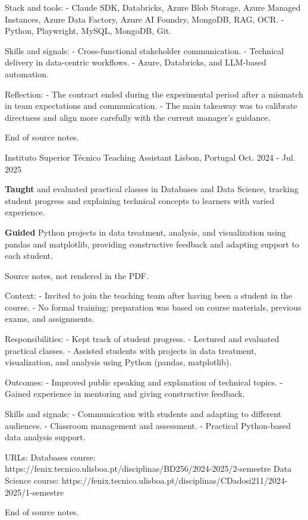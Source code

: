 \begin{cventries}
{    Stack and tools:
    - Claude SDK, Databricks, Azure Blob Storage, Azure Managed Instances, Azure Data Factory, Azure AI Foundry, MongoDB, RAG, OCR.
    - Python, Playwright, MySQL, MongoDB, Git.

    Skills and signals:
    - Cross-functional stakeholder communication.
    - Technical delivery in data-centric workflows.
    - Azure, Databricks, and LLM-based automation.

    Reflection:
    - The contract ended during the experimental period after a mismatch in team expectations and communication.
    - The main takeaway was to calibrate directness and align more carefully with the current manager's guidance.

    End of source notes.
  }

\cventry
  {Instituto Superior Técnico} %
  {Teaching Assistant} %
  {Lisbon, Portugal} %
  {Oct. 2024 - Jul. 2025} %
  {
    \begin{cvitems} %
      \item {\textbf{Taught} and evaluated practical classes in Databases and Data Science, tracking student progress and explaining technical concepts to learners with varied experience.}
      \item {\textbf{Guided} Python projects in data treatment, analysis, and visualization using pandas and matplotlib, providing constructive feedback and adapting support to each student.}
    \end{cvitems}
  }
  {
    Source notes, not rendered in the PDF.

    Context:
    - Invited to join the teaching team after having been a student in the course.
    - No formal training; preparation was based on course materials, previous exams, and assignments.

    Responsibilities:
    - Kept track of student progress.
    - Lectured and evaluated practical classes.
    - Assisted students with projects in data treatment, visualization, and analysis using Python (pandas, matplotlib).

    Outcomes:
    - Improved public speaking and explanation of technical topics.
    - Gained experience in mentoring and giving constructive feedback.

    Skills and signals:
    - Communication with students and adapting to different audiences.
    - Classroom management and assessment.
    - Practical Python-based data analysis support.

    URLs:
    Databases course: https://fenix.tecnico.ulisboa.pt/disciplinas/BD256/2024-2025/2-semestre
    Data Science course: https://fenix.tecnico.ulisboa.pt/disciplinas/CDadosi211/2024-2025/1-semestre

    End of source notes.
  }
\end{cventries}
